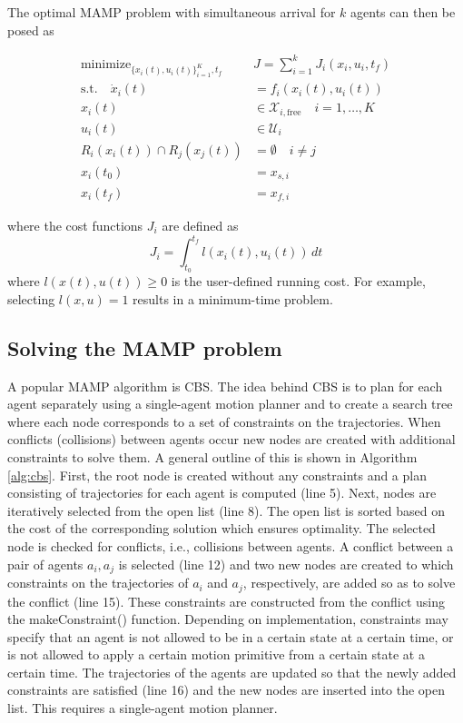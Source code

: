 \documentclass[letterpaper, 10 pt, conference]{ieeeconf}  %
\DeclareMathOperator*{\minimize}{minimize}
\begin{document}
The optimal MAMP problem with simultaneous arrival for $k$ agents can then be posed as

\begin{subequations}
\label{eq:opt-mamp}
\begin{align}
\minimize_{\{x_i(t), u_i(t)\}_{i=1}^{K}, t_f} \quad & J = \sum_{i=1}^{k} J_i(x_i, u_i, t_f) \\
\text{s.t.} \quad \dot{x}_i(t) & = f_i(x_i(t), u_i(t)) \\
x_i(t) & \in \mathcal{X}_{i, \text{free}} \quad i = 1, \dots, K \\
u_i(t) & \in \mathcal{U}_i \\
R_i(x_i(t)) \cap R_j(x_j(t)) & = \emptyset \label{subeq:collision} \quad i \neq j \\ 
\label{subeq:init} x_i(t_0) & = x_{s, i} \\ 
\label{subeq:terminal} x_i(t_f) & = x_{f, i} 
\end{align}
\end{subequations}

\noindent where the cost functions $J_i$ are defined as
\begin{equation}
\label{eq:costl}
J_i = \int_{t_0}^{t_f} l(x_i(t), u_i(t)) \, dt
\end{equation}
\noindent where $l(x(t), u(t)) \geq 0$ is the user-defined running cost. For example, selecting $l(x, u) = 1$ results in a minimum-time problem.

\subsection{Solving the MAMP problem}

A popular MAMP algorithm is CBS. The idea behind CBS is to plan for each agent separately using a single-agent motion planner and to create a search tree where each node corresponds to a set of constraints on the trajectories. When conflicts (collisions) between agents occur new nodes are created with additional constraints to solve them. A general outline of this is shown in Algorithm \ref{alg:cbs}. First, the root node is created without any constraints and a plan consisting of trajectories for each agent is computed (line 5). Next, nodes are iteratively selected from the open list (line 8). The open list is sorted based on the cost of the corresponding solution which ensures optimality. The selected node is checked for conflicts, i.e., collisions between agents. A conflict between a pair of agents $a_i, a_j$ is selected (line 12) and two new nodes are created to which constraints on the trajectories of $a_i$ and $a_j$, respectively, are added so as to solve the conflict (line 15). These constraints are constructed from the conflict using the makeConstraint() function. Depending on implementation, constraints may specify that an agent is not allowed to be in a certain state at a certain time, or is not allowed to apply a certain motion primitive from a certain state at a certain time. The trajectories of the agents are updated so that the newly added constraints are satisfied (line 16) and the new nodes are inserted into the open list. This requires a single-agent motion planner.
\end{document}
